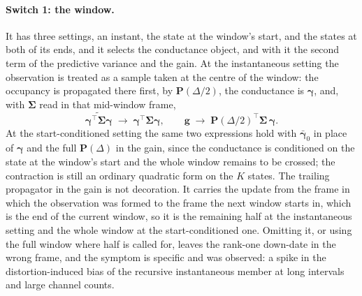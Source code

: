 \begin{appendixbox}
\paragraph{Switch 1: the window.} It has three settings, an instant, the state at the
window's start, and the states at both of its ends, and it selects the conductance object,
and with it the second term of the predictive variance and the gain. At the instantaneous
setting the observation is treated as a sample taken at the centre of
the window: the occupancy is propagated there first, by $\mathbf{P}(\Delta/2)$, the conductance
is $\bm{\gamma}$, and, with $\bm{\Sigma}$ read in that mid-window frame,
\begin{equation}
  \widetilde{\bm{\gamma}^\top\bm{\Sigma}\bm{\gamma}} \;\to\; \bm{\gamma}^\top\bm{\Sigma}\bm{\gamma},
  \qquad
  \mathbf{g} \;\to\; \mathbf{P}(\Delta/2)^\top\bm{\Sigma}\,\bm{\gamma}.
  \label{eq:av0}
\end{equation}
At the start-conditioned setting the same two expressions hold with $\bar{\bm{\gamma}}_0$ in
place of $\bm{\gamma}$ and the full $\mathbf{P}(\Delta)$ in the gain, since the conductance is
conditioned on the state at the window's start and the whole window remains to be crossed;
the contraction is still an ordinary quadratic form on the $K$ states.
The trailing propagator in the gain is not decoration. It carries the update from the frame in
which the observation was formed to the frame the next window starts in, which is the end of
the current window, so it is the remaining half at the instantaneous setting and the whole
window at the start-conditioned one. Omitting it, or using the full window where half is called for, leaves the
rank-one down-date in the wrong frame, and the symptom is specific and was observed: a spike in
the distortion-induced bias of the recursive instantaneous member at long intervals and large
channel counts.

\end{appendixbox}
